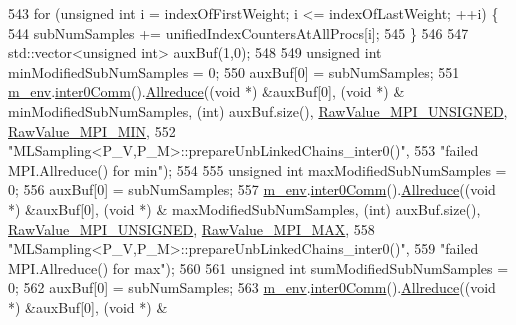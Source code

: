 \begin{DoxyCode}
543   \textcolor{keywordflow}{for} (\textcolor{keywordtype}{unsigned} \textcolor{keywordtype}{int} i = indexOfFirstWeight; i <= indexOfLastWeight; ++i) \{
544     subNumSamples += unifiedIndexCountersAtAllProcs[i];
545   \}
546 
547   std::vector<unsigned int> auxBuf(1,0);
548 
549   \textcolor{keywordtype}{unsigned} \textcolor{keywordtype}{int} minModifiedSubNumSamples = 0;
550   auxBuf[0] = subNumSamples;
551   \hyperlink{class_q_u_e_s_o_1_1_m_l_sampling_a13f1ca4fe9f94822fe572a743eaced1d}{m\_env}.\hyperlink{class_q_u_e_s_o_1_1_base_environment_a689e4d140c74d495d97eb498714a4b82}{inter0Comm}().\hyperlink{class_q_u_e_s_o_1_1_mpi_comm_a72e137e60ef8060efb1ee5fc874fa4b8}{Allreduce}((\textcolor{keywordtype}{void} *) &auxBuf[0], (\textcolor{keywordtype}{void} *) &
      minModifiedSubNumSamples, (\textcolor{keywordtype}{int}) auxBuf.size(), \hyperlink{_mpi_comm_8h_a06cbfbc33436f6e0dc8a48ff3c49bdfc}{RawValue\_MPI\_UNSIGNED}, 
      \hyperlink{_mpi_comm_8h_a8e30f42fdac116861205e83e2aa18042}{RawValue\_MPI\_MIN},
552                                \textcolor{stringliteral}{"MLSampling<P\_V,P\_M>::prepareUnbLinkedChains\_inter0()"},
553                                \textcolor{stringliteral}{"failed MPI.Allreduce() for min"});
554 
555   \textcolor{keywordtype}{unsigned} \textcolor{keywordtype}{int} maxModifiedSubNumSamples = 0;
556   auxBuf[0] = subNumSamples;
557   \hyperlink{class_q_u_e_s_o_1_1_m_l_sampling_a13f1ca4fe9f94822fe572a743eaced1d}{m\_env}.\hyperlink{class_q_u_e_s_o_1_1_base_environment_a689e4d140c74d495d97eb498714a4b82}{inter0Comm}().\hyperlink{class_q_u_e_s_o_1_1_mpi_comm_a72e137e60ef8060efb1ee5fc874fa4b8}{Allreduce}((\textcolor{keywordtype}{void} *) &auxBuf[0], (\textcolor{keywordtype}{void} *) &
      maxModifiedSubNumSamples, (\textcolor{keywordtype}{int}) auxBuf.size(), \hyperlink{_mpi_comm_8h_a06cbfbc33436f6e0dc8a48ff3c49bdfc}{RawValue\_MPI\_UNSIGNED}, 
      \hyperlink{_mpi_comm_8h_a68f3ac7ff71a6504e236b0c95de78178}{RawValue\_MPI\_MAX},
558                                \textcolor{stringliteral}{"MLSampling<P\_V,P\_M>::prepareUnbLinkedChains\_inter0()"},
559                                \textcolor{stringliteral}{"failed MPI.Allreduce() for max"});
560 
561   \textcolor{keywordtype}{unsigned} \textcolor{keywordtype}{int} sumModifiedSubNumSamples = 0;
562   auxBuf[0] = subNumSamples;
563   \hyperlink{class_q_u_e_s_o_1_1_m_l_sampling_a13f1ca4fe9f94822fe572a743eaced1d}{m\_env}.\hyperlink{class_q_u_e_s_o_1_1_base_environment_a689e4d140c74d495d97eb498714a4b82}{inter0Comm}().\hyperlink{class_q_u_e_s_o_1_1_mpi_comm_a72e137e60ef8060efb1ee5fc874fa4b8}{Allreduce}((\textcolor{keywordtype}{void} *) &auxBuf[0], (\textcolor{keywordtype}{void} *) &

\end{DoxyCode}
